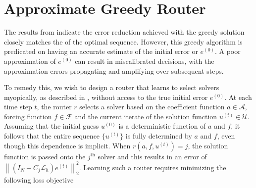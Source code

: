 \documentclass[12pt]{article}
\begin{document}


\section{Approximate Greedy Router} \label{sec:approxgreedy}

The results from  indicate the error reduction achieved with the  greedy solution closely matches the of the optimal sequence. However, this greedy algorithm is predicated on having an accurate estimate of the initial error or $e^{(0)}$. A poor approximation of $e^{(0)}$ can result in miscalibrated decisions, with the approximation errors propagating and amplifying over subsequent steps. 

To remedy this, we wish to design a router that learns to select solvers myopically, as described in , without access to the true initial error $e^{(0)}$. At each time step $t$, the router $r$ selects a solver based on the coefficient function $a \in \mathcal{A}$, forcing function $f \in \mathcal{F}$ and the current iterate of the solution function $u^{(t)} \in \mathcal{U}$. Assuming that the initial guess $u^{(0)}$ is a deterministic function of $a$ and $f$, it follows that the entire sequence $\{u^{(t)}\}$ is fully determined by $a$ and $f$, even though this dependence is implicit.
When $r(a, f, u^{(t)}) = j$, the solution function is passed onto the $j^{\text{th}}$ solver and this results in an error of $\left\|\left( I_N - C_{j} \mathcal{L}_{h}\right)e^{(t)}\right\|^2_2$. Learning such a router requires minimizing the following loss objective
\end{document}
